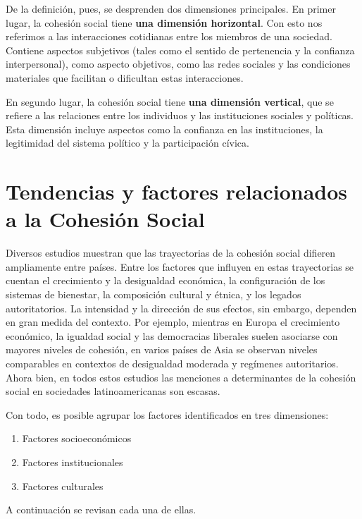 \documentclass[
  spanish,
  letterpaper,
  DIV=11,
  numbers=noendperiod]{scrartcl}
\providecommand{\tightlist}{%
  \setlength{\itemsep}{0pt}\setlength{\parskip}{0pt}}
\begin{document}
De la definición, pues, se desprenden dos dimensiones principales. En
primer lugar, la cohesión social tiene \textbf{una dimensión
horizontal}. Con esto nos referimos a las interacciones cotidianas entre
los miembros de una sociedad. Contiene aspectos subjetivos (tales como
el sentido de pertenencia y la confianza interpersonal), como aspecto
objetivos, como las redes sociales y las condiciones materiales que
facilitan o dificultan estas interacciones.

En segundo lugar, la cohesión social tiene \textbf{una dimensión
vertical}, que se refiere a las relaciones entre los individuos y las
instituciones sociales y políticas. Esta dimensión incluye aspectos como
la confianza en las instituciones, la legitimidad del sistema político y
la participación cívica.

\section{Tendencias y factores relacionados a la Cohesión
Social}\label{tendencias-y-factores-relacionados-a-la-cohesiuxf3n-social}

Diversos estudios muestran que las trayectorias de la cohesión social
difieren ampliamente entre países. Entre los factores que influyen en
estas trayectorias se cuentan el crecimiento y la desigualdad económica,
la configuración de los sistemas de bienestar, la composición cultural y
étnica, y los legados autoritatorios. La intensidad y la dirección de
sus efectos, sin embargo, dependen en gran medida del contexto. Por
ejemplo, mientras en Europa el crecimiento económico, la igualdad social
y las democracias liberales suelen asociarse con mayores niveles de
cohesión, en varios países de Asia se observan niveles comparables en
contextos de desigualdad moderada y regímenes autoritarios. Ahora bien,
en todos estos estudios las menciones a determinantes de la cohesión
social en sociedades latinoamericanas son escasas.

Con todo, es posible agrupar los factores identificados en tres
dimensiones:

\begin{enumerate}
\def\labelenumi{\arabic{enumi}.}
\tightlist
\item
  Factores socioeconómicos
\item
  Factores institucionales
\item
  Factores culturales
\end{enumerate}

A continuación se revisan cada una de ellas.
\end{document}
